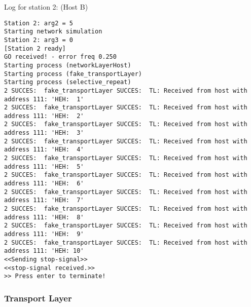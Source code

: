 Log for station 2: (Host B)
\begin{lstlisting}[breaklines=true]
Station 2: arg2 = 5
Starting network simulation
Station 2: arg3 = 0
[Station 2 ready]
GO received! - error freq 0.250
Starting process (networkLayerHost)
Starting process (fake_transportLayer)
Starting process (selective_repeat)
2 SUCCES:  fake_transportLayer SUCCES:  TL: Received from host with address 111: 'HEH:  1'
2 SUCCES:  fake_transportLayer SUCCES:  TL: Received from host with address 111: 'HEH:  2'
2 SUCCES:  fake_transportLayer SUCCES:  TL: Received from host with address 111: 'HEH:  3'
2 SUCCES:  fake_transportLayer SUCCES:  TL: Received from host with address 111: 'HEH:  4'
2 SUCCES:  fake_transportLayer SUCCES:  TL: Received from host with address 111: 'HEH:  5'
2 SUCCES:  fake_transportLayer SUCCES:  TL: Received from host with address 111: 'HEH:  6'
2 SUCCES:  fake_transportLayer SUCCES:  TL: Received from host with address 111: 'HEH:  7'
2 SUCCES:  fake_transportLayer SUCCES:  TL: Received from host with address 111: 'HEH:  8'
2 SUCCES:  fake_transportLayer SUCCES:  TL: Received from host with address 111: 'HEH:  9'
2 SUCCES:  fake_transportLayer SUCCES:  TL: Received from host with address 111: 'HEH: 10'
<<Sending stop-signal>>
<<stop-signal received.>>
>> Press enter to terminate!
\end{lstlisting}


\subsubsection{Transport Layer}

